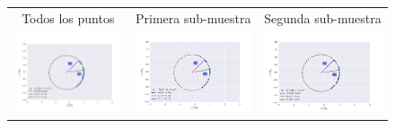 \begin{figure}
\begin{tabular}{@{}c@{}c@{}c@{}}
 
Todos los puntos & Primera sub-muestra & Segunda sub-muestra \\ \includegraphics[clip]{./Figures/LV-bowshocks-xyfancy-positionswill-177-341} & \includegraphics[clip]{./Figures/LV-bowshocks-xyfancy-positionssamp00-177-341} &
\includegraphics[clip]{./Figures/LV-bowshocks-xyfancy-positionssamp01-177-341} \\

\end{tabular}
\end{figure}
